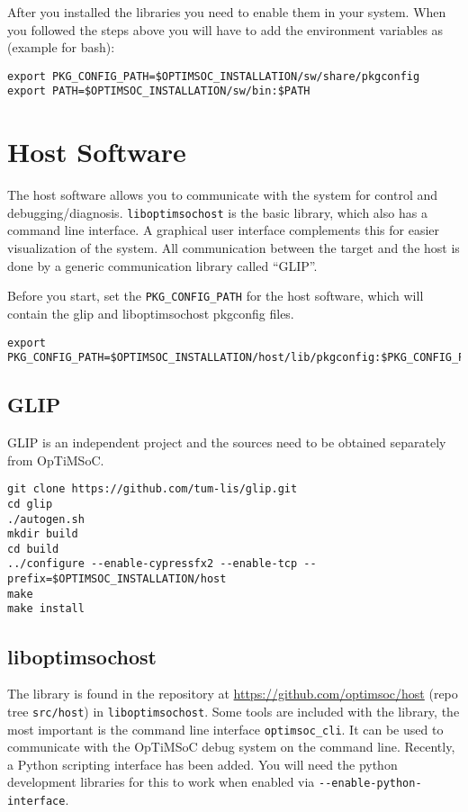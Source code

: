 After you installed the libraries you need to enable them in your
system. When you followed the steps above you will have to add the
environment variables as (example for bash):

\begin{lstlisting}
export PKG_CONFIG_PATH=$OPTIMSOC_INSTALLATION/sw/share/pkgconfig
export PATH=$OPTIMSOC_INSTALLATION/sw/bin:$PATH
\end{lstlisting}

\section{Host Software}

The host software allows you to communicate with the system for
control and debugging/diagnosis. \verb|liboptimsochost| is the basic
library, which also has a command line interface. A graphical user
interface complements this for easier visualization of the system. All
communication between the target and the host is done by a generic communication
library called ``GLIP''.

Before you start, set the \verb|PKG_CONFIG_PATH| for the host software, which
will contain the glip and liboptimsochost pkgconfig files.

\begin{lstlisting}
export PKG_CONFIG_PATH=$OPTIMSOC_INSTALLATION/host/lib/pkgconfig:$PKG_CONFIG_PATH
\end{lstlisting}

\subsection{GLIP}

GLIP is an independent project and the sources need to be obtained separately
from OpTiMSoC.

\begin{lstlisting}
git clone https://github.com/tum-lis/glip.git
cd glip
./autogen.sh
mkdir build
cd build
../configure --enable-cypressfx2 --enable-tcp --prefix=$OPTIMSOC_INSTALLATION/host
make
make install
\end{lstlisting}

\subsection{liboptimsochost}

The library is found in the repository at
\url{https://github.com/optimsoc/host} (repo tree \verb|src/host|) in
\verb|liboptimsochost|.  Some tools are included with the library, the
most important is the command line interface \verb|optimsoc_cli|. It
can be used to communicate with the OpTiMSoC debug system on the
command line. Recently, a Python scripting interface has been
added. You will need the python development libraries for this to work
when enabled via \verb|--enable-python-interface|.

